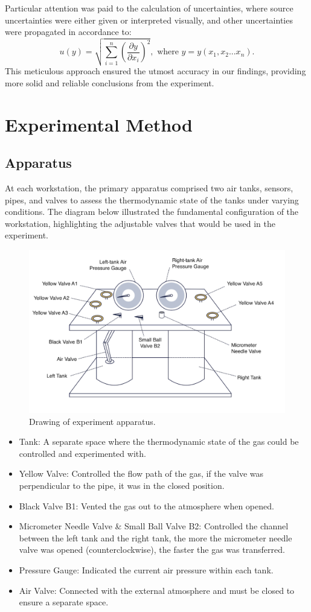 \documentclass[12pt]{article}
\begin{document}
Particular attention was paid to the calculation of uncertainties, where source uncertainties were either given or interpreted visually, and other uncertainties were propagated in accordance to:
\begin{equation}
    u(y)=\sqrt{\sum^n_{i=1}\left(\frac{\partial y}{\partial x_i}\right)^2 },\text{ where }y=y(x_1, x_2...x_n).
\end{equation}
This meticulous approach \autocite{lee2009comparative} ensured the utmost accuracy in our findings, providing more solid and reliable conclusions from the experiment.

\section*{Experimental Method}
\subsection*{Apparatus}
At each workstation, the primary apparatus comprised two air tanks, sensors, pipes, and valves to assess the thermodynamic state of the tanks under varying conditions. The diagram below illustrated the fundamental configuration of the workstation, highlighting the adjustable valves that would be used in the experiment.
\begin{figure}[t!]
\centering
\includegraphics[width=0.7\linewidth]{figure/aparatus.png}
\caption{Drawing of experiment apparatus.}
\label{fig:aparatus}
\end{figure}
\begin{itemize}
    \item Tank: A separate space where the thermodynamic state of the gas could be controlled and experimented with.
    \item Yellow Valve: Controlled the flow path of the gas, if the valve was perpendicular to the pipe, it was in the closed position.
    \item Black Valve B1: Vented the gas out to the atmosphere when opened.
    \item Micrometer Needle Valve \& Small Ball Valve B2: Controlled the channel between the left tank and the right tank, the more the micrometer needle valve was opened (counterclockwise), the faster the gas was transferred.
    \item Pressure Gauge: Indicated the current air pressure within each tank.
    \item Air Valve: Connected with the external atmosphere and must be closed to ensure a separate space.
\end{itemize}
\end{document}

